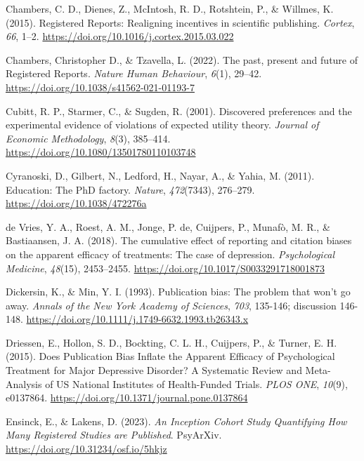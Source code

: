 \documentclass[
  ,man,mask,floatsintext]{apa6}
\newlength{\cslhangindent}
\newlength{\cslentryspacingunit} %
\newenvironment{CSLReferences}[2] %
 {%
  \setlength{\parindent}{0pt}
  \ifodd #1
  \let\oldpar\par
  \def\par{\hangindent=\cslhangindent\oldpar}
  \fi
  \setlength{\parskip}{#2\cslentryspacingunit}
 }%
 {}
\begin{document}
\begin{CSLReferences}{1}{0}
\leavevmode{}%
Chambers, C. D., Dienes, Z., McIntosh, R. D., Rotshtein, P., \& Willmes, K. (2015). Registered {Reports}: {Realigning} incentives in scientific publishing. \emph{Cortex}, \emph{66}, 1--2. \url{https://doi.org/10.1016/j.cortex.2015.03.022}

\leavevmode{}%
Chambers, Christopher D., \& Tzavella, L. (2022). The past, present and future of {Registered Reports}. \emph{Nature Human Behaviour}, \emph{6}(1), 29--42. \url{https://doi.org/10.1038/s41562-021-01193-7}

\leavevmode{}%
Cubitt, R. P., Starmer, C., \& Sugden, R. (2001). Discovered preferences and the experimental evidence of violations of expected utility theory. \emph{Journal of Economic Methodology}, \emph{8}(3), 385--414. \url{https://doi.org/10.1080/13501780110103748}

\leavevmode{}%
Cyranoski, D., Gilbert, N., Ledford, H., Nayar, A., \& Yahia, M. (2011). Education: {The PhD} factory. \emph{Nature}, \emph{472}(7343), 276--279. \url{https://doi.org/10.1038/472276a}

\leavevmode{}%
de Vries, Y. A., Roest, A. M., Jonge, P. de, Cuijpers, P., Munafò, M. R., \& Bastiaansen, J. A. (2018). The cumulative effect of reporting and citation biases on the apparent efficacy of treatments: The case of depression. \emph{Psychological Medicine}, \emph{48}(15), 2453--2455. \url{https://doi.org/10.1017/S0033291718001873}

\leavevmode{}%
Dickersin, K., \& Min, Y. I. (1993). Publication bias: The problem that won't go away. \emph{Annals of the New York Academy of Sciences}, \emph{703}, 135-146; discussion 146-148. \url{https://doi.org/10.1111/j.1749-6632.1993.tb26343.x}

\leavevmode{}%
Driessen, E., Hollon, S. D., Bockting, C. L. H., Cuijpers, P., \& Turner, E. H. (2015). Does {Publication Bias Inflate} the {Apparent Efficacy} of {Psychological Treatment} for {Major Depressive Disorder}? {A Systematic Review} and {Meta-Analysis} of {US National Institutes} of {Health-Funded Trials}. \emph{PLOS ONE}, \emph{10}(9), e0137864. \url{https://doi.org/10.1371/journal.pone.0137864}

\leavevmode{}%
Ensinck, E., \& Lakens, D. (2023). \emph{An {Inception Cohort Study Quantifying How Many Registered Studies} are {Published}}. PsyArXiv. \url{https://doi.org/10.31234/osf.io/5hkjz}


\end{CSLReferences}
\end{document}
